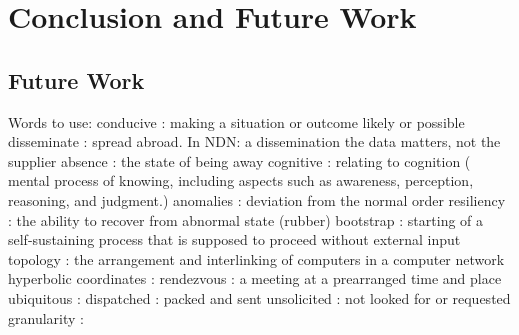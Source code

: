 \chapter{Conclusion and Future Work}\label{chp7:conclusion}

\section{Future Work}


Words to use:
conducive : making a situation or outcome likely or possible
disseminate : spread abroad. 
In NDN: a dissemination the data matters, not the supplier
absence : the state of being away
cognitive : relating to cognition ( mental process of knowing, including aspects such as awareness, perception, reasoning, and judgment.)
anomalies : deviation from the normal order
resiliency : the ability to recover from abnormal state (rubber)
bootstrap : starting of a self-sustaining process that is supposed to proceed without external input
topology : the arrangement and interlinking of computers in a computer network
hyperbolic coordinates : 
rendezvous : a meeting at a prearranged time and place
ubiquitous : 
dispatched : packed and sent					
unsolicited : not looked for or requested
granularity : 
